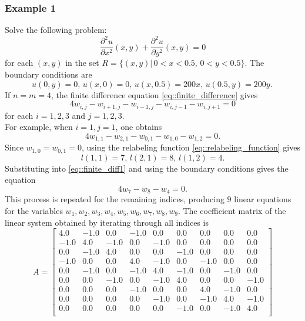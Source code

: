 \documentclass[a4paper]{article}
\begin{document}
\subsubsection{Example 1}
Solve the following problem:
\begin{equation}
\frac{\partial^2 u}{\partial x^2}(x,y)+\frac{\partial^2 u}{\partial y^2}(x,y)=0
\end{equation}
for each $(x,y)$ in the set $R=\{ (x,y)|\, 0<x<0.5,\, 0<y<0.5 \}$. The boundary conditions are
\begin{equation*}
u(0,y)=0,\,u(x,0)=0,\, u(x,0.5)=200x,\, u(0.5,y)=200y.\,
\end{equation*}
If $n=m=4$, the finite difference equation \ref{eq::finite_difference} gives
\begin{equation}
4w_{i,j}-w_{i+1,j}-w_{i-1,j}-w_{i,j-1}-w_{i,j+1}=0
\end{equation}
for each $i=1,2,3$ and $j=1,2,3$.\\
For example, when $i=1,j=1$, one obtains
\begin{equation}\label{eq::finite_diff1}
4w_{1,1}-w_{2,1}-w_{0,1}-w_{1,0}-w_{1,2}=0.
\end{equation}
Since $w_{1,0}=w_{0,1}=0$, using the relabeling function \ref{eq::relabeling_function} gives
\begin{equation*}
l(1,1)=7,\,l(2,1)=8,\,l(1,2)=4.
\end{equation*}
Substituting into \ref{eq::finite_diff1} and using the boundary conditions gives the equation
\begin{equation*}
4w_{7}-w_{8}-w_{4}=0.
\end{equation*}
This process is repeated for the remaining indices, producing $9$ linear equations for the variables $w_1,w_2,w_3,w_4,w_5,w_6,w_7,w_8,w_9$. The coefficient matrix of the linear system obtained by iterating through all indices is
\begin{equation}\label{eq::block_tridiagonal_matrix_1}
A =
\begin{bmatrix}
4.0 & -1.0 & 0.0 & -1.0 & 0.0 & 0.0 & 0.0 & 0.0 & 0.0 \\
-1.0 & 4.0 & -1.0 & 0.0 & -1.0 & 0.0 & 0.0 & 0.0 & 0.0 \\
0.0 & -1.0 & 4.0 & 0.0 & 0.0 & -1.0 & 0.0 & 0.0 & 0.0 \\
-1.0 & 0.0 & 0.0 & 4.0 & -1.0 & 0.0 & -1.0 & 0.0 & 0.0 \\
0.0 & -1.0 & 0.0 & -1.0 & 4.0 & -1.0 & 0.0 & -1.0 & 0.0 \\
0.0 & 0.0 & -1.0 & 0.0 & -1.0 & 4.0 & 0.0 & 0.0 & -1.0 \\
0.0 & 0.0 & 0.0 & -1.0 & 0.0 & 0.0 & 4.0 & -1.0 & 0.0 \\
0.0 & 0.0 & 0.0 & 0.0 & -1.0 & 0.0 & -1.0 & 4.0 & -1.0 \\
0.0 & 0.0 & 0.0 & 0.0 & 0.0 & -1.0 & 0.0 & -1.0 & 4.0 \\
\end{bmatrix}
\end{equation}
\end{document}
